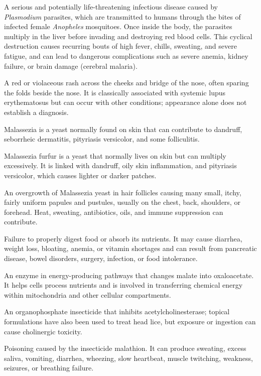  A serious and potentially life-threatening infectious disease caused by \textit{Plasmodium} parasites, which are transmitted to humans through the bites of infected female \textit{Anopheles} mosquitoes. Once inside the body, the parasites multiply in the liver before invading and destroying red blood cells. This cyclical destruction causes recurring bouts of high fever, chills, sweating, and severe fatigue, and can lead to dangerous complications such as severe anemia, kidney failure, or brain damage (cerebral malaria).

 A red or violaceous rash across the cheeks and bridge of the nose, often sparing the folds beside the nose.
It is classically associated with systemic lupus erythematosus but can occur with other conditions;
appearance alone does not establish a diagnosis.

 Malassezia is a yeast normally found on skin that can contribute to dandruff, seborrheic dermatitis, pityriasis versicolor, and some folliculitis.

 Malassezia furfur is a yeast that normally lives on skin but can multiply excessively. It is linked with dandruff, oily skin inflammation, and pityriasis versicolor, which causes lighter or darker patches.

 An overgrowth of Malassezia yeast in hair follicles causing many small, itchy, fairly uniform papules and pustules, usually on the chest, back, shoulders, or forehead. Heat, sweating, antibiotics, oils, and immune suppression can contribute.

 Failure to properly digest food or absorb its nutrients. It may cause diarrhea, weight loss, bloating, anemia, or vitamin shortages and can result from pancreatic disease, bowel disorders, surgery, infection, or food intolerance.

 An enzyme in energy-producing pathways that changes malate into oxaloacetate. It helps cells process nutrients and is involved in transferring chemical energy within mitochondria and other cellular compartments.

 An organophosphate insecticide that inhibits acetylcholinesterase; topical formulations have also been used to treat head lice, but exposure or ingestion can cause cholinergic toxicity.

 Poisoning caused by the insecticide malathion. It can produce sweating, excess saliva, vomiting, diarrhea, wheezing, slow heartbeat, muscle twitching, weakness, seizures, or breathing failure.

